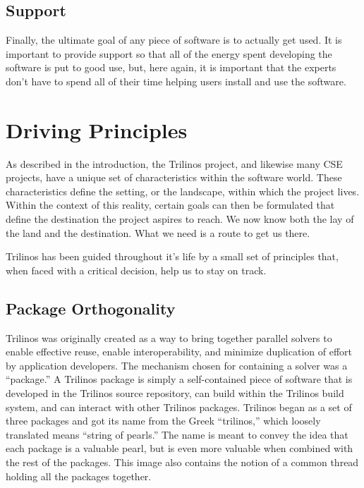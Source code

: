 \documentclass[12pt,relax]{article}
\begin{document}
\subsection{Support}
Finally, the ultimate goal of any piece of software is to actually get used.  
It is important to provide support so that all of the energy spent developing
the software is put to good use, but, here again, it is important that the
experts don't have to spend all of their time helping users install and use the
software.

\clearpage


\section{Driving Principles}
\label{Section:Driving Principles}

As described in the introduction, the Trilinos project, and likewise many CSE
projects, have a unique set of characteristics within the software world.
These characteristics define the setting, or the landscape, within which the
project lives.  Within the context of this reality, certain goals can then be
formulated that define the destination the project aspires to reach.  We now
know both the lay of the land and the destination.  What we need is a route to
get us there.

Trilinos has been guided throughout it's life by a small set of principles
that, when faced with a critical decision, help us to stay on track.  

\subsection{Package Orthogonality}

Trilinos was originally created as a way to bring together parallel solvers
to enable effective reuse, enable interoperability, and minimize duplication of
effort by application developers.  The mechanism chosen for containing a solver
was a ``package.''  A Trilinos package is simply a self-contained piece of
software that is developed in the Trilinos source repository, can build within
the Trilinos build system, and can interact with other Trilinos packages.
Trilinos began as a set of three packages and got its name from the Greek 
``trilinos,'' which loosely translated means ``string of pearls.''  The name is
meant to convey the idea that each package is a valuable pearl, but is even
more valuable when combined with the rest of the packages.  This image also
contains the notion of a common thread holding all the packages together.
\end{document}
